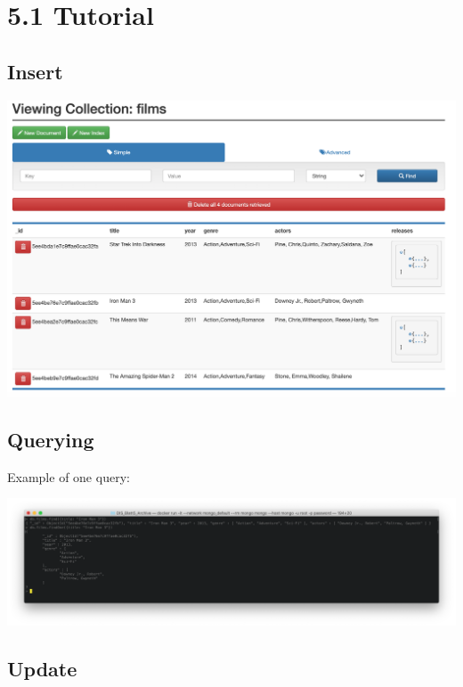 \documentclass[ngerman]{dis-template-add}
\begin{document}
\section*{5.1 Tutorial}

\subsection*{Insert}

\includegraphics[scale=0.3]{insert.png}

\subsection*{Querying}

Example of one query:

\includegraphics[scale=0.3]{query.png}

\subsection*{Update}
\end{document}

